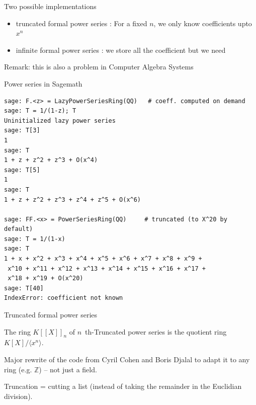 \documentclass[compress,11pt]{beamer}
\newcommand{\Z}{{\mathbb Z}}
\renewcommand{\emph}[1]{{\color{red} #1}}
\begin{document}
\begin{frame}{Two possible implementations}

  \begin{NOTE}
    \begin{itemize}
    \item \emph{truncated formal power series} : For a fixed $n$, we only
      know coefficients upto $x^n$ \bigskip

    \item infinite \emph{formal power series} : we store all the coefficient
      but we need 
    \end{itemize}
  \end{NOTE}
  \bigskip

  Remark: this is also a problem in Computer Algebra Systems
\end{frame}


\begin{frame}[fragile]{Power series in Sagemath}

  \scriptsize
  \begin{verbatim}
sage: F.<z> = LazyPowerSeriesRing(QQ)   # coeff. computed on demand
sage: T = 1/(1-z); T
Uninitialized lazy power series
sage: T[3]
1
sage: T
1 + z + z^2 + z^3 + O(x^4)
sage: T[5]
1
sage: T
1 + z + z^2 + z^3 + z^4 + z^5 + O(x^6)

sage: FF.<x> = PowerSeriesRing(QQ)     # truncated (to X^20 by default)
sage: T = 1/(1-x)
sage: T
1 + x + x^2 + x^3 + x^4 + x^5 + x^6 + x^7 + x^8 + x^9 +
 x^10 + x^11 + x^12 + x^13 + x^14 + x^15 + x^16 + x^17 +
 x^18 + x^19 + O(x^20)
sage: T[40]
IndexError: coefficient not known
  \end{verbatim}
\end{frame}

\begin{frame}[fragile]{Truncated formal power series}

  \begin{DEFN}
    The ring $K[[X]]_n$ of \emph{$n$~th-Truncated power series} is
    the quotient ring $K[X]/\langle x^n\rangle$.
  \end{DEFN}
  \bigskip\pause

  Major rewrite of the code from Cyril Cohen and Boris Djalal to adapt it to
  any ring (e.g. $\Z$) -- not just a field.  \bigskip

  Truncation = cutting a list (instead of taking the remainder in the
  Euclidian division).
\end{frame}
\end{document}
